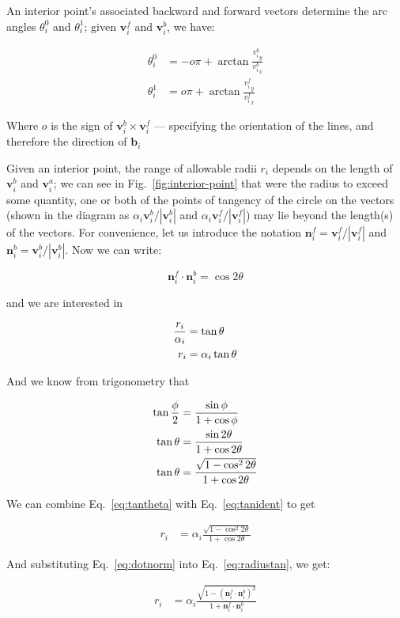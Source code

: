 \documentclass{article}
\begin{document}
An interior point's associated backward and forward vectors determine the arc angles $\theta^0_i$ and $\theta^{1}_{i}$; given $\mathbf{v}^{f}_{i}$ and $\mathbf{v}^{b}_{i}$, we have:

\begin{align}
  \theta^{0}_{i} &= -o\pi + \arctan \frac{{v^{b}_{i}}_{y}}{{v^{b}_{i}}_{x}}\\
  \theta^{1}_{i} &=  o\pi + \arctan \frac{{v^{f}_{i}}_{y}}{{v^{f}_{i}}_{x}}
\end{align}

Where $o$ is the sign of $\mathbf{v}^{b}_{i}\times\mathbf{v}^{f}_{i}$ --- specifying the orientation of the lines, and therefore the direction of $\mathbf{b}_{i}$

Given an interior point, the range of allowable radii $r_{i}$ depends on the length of $\mathbf{v}^{b}_{i}$ and $\mathbf{v}^{a}_{i}$; we can see in Fig.~\ref{fig:interior-point} that were the radius to exceed some quantity, one or both of the points of tangency of the circle on the vectors (shown in the diagram as $\alpha_i\mathbf{v}^b_i/|\mathbf{v}^b_i|$ and $\alpha_i\mathbf{v}^f_i/|\mathbf{v}^f_i|$) may lie beyond the length(s) of the vectors.  For convenience, let us introduce the notation $\mathbf{n}^{f}_{i} = \mathbf{v}^f_i/|\mathbf{v}^f_i|$ and $\mathbf{n}^{b}_{i} = \mathbf{v}^b_i/|\mathbf{v}^b_i|$.  Now we can write:

\begin{equation}
  \label{eq:dotnorm}
  \mathbf{n}^{f}_{i} \cdot \mathbf{n}^{b}_{i} = \cos 2\theta
\end{equation}

and we are interested in

\begin{align}
  \notag
  \frac{r_i}{\alpha_{i}} &= \tan \theta\\
  \label{eq:tantheta}
  r_i &= \alpha_{i}\tan \theta
\end{align}

And we know from trigonometry that

\begin{align}
  \notag
  \tan \frac{\phi}{2} &= \frac{\sin\phi}{1+\cos\phi}\\
  \notag
  \tan \theta &= \frac{\sin 2\theta}{1+\cos 2\theta}\\
  \label{eq:tanident}
  \tan \theta &= \frac{\sqrt{1-\cos^{2} 2\theta}}{1+\cos 2\theta}
\end{align}

We can combine Eq.~\eqref{eq:tantheta} with Eq.~\eqref{eq:tanident} to get

\begin{align}
  \label{eq:radiustan}
  r_{i} &= \alpha_i\frac{\sqrt{1-\cos^{2} 2\theta}}{1+\cos 2\theta}
\end{align}

And substituting Eq.~\eqref{eq:dotnorm} into Eq.~\eqref{eq:radiustan}, we get:

\begin{align}
  \label{eq:radiustan}
  r_{i} &= \alpha_i\frac{\sqrt{1-\left(\mathbf{n}^f_i\cdot \mathbf{n}^b_i\right)^{2}}}{1+\mathbf{n}^f_i\cdot \mathbf{n}^b_i}
\end{align}
\end{document}
